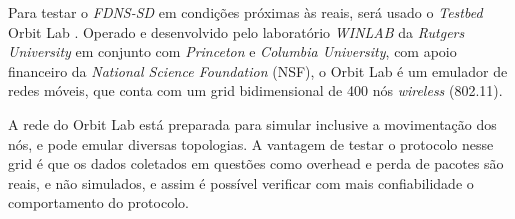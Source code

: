 
Para testar o \textit{FDNS-SD} em condições próximas às reais, será usado o
\textit{Testbed} Orbit Lab \cite{orbit}. Operado e desenvolvido pelo laboratório
\textit{WINLAB} \cite{winlab} da \textit{Rutgers University} em conjunto com
\textit{Princeton} e \textit{Columbia University}, com apoio financeiro da
\textit{National Science Foundation} (NSF), o Orbit Lab é um emulador de redes
móveis, que conta com um grid bidimensional de 400 nós \textit{wireless} (802.11).

A rede do Orbit Lab está preparada para simular inclusive a movimentação dos nós,
e pode emular diversas topologias. A vantagem de testar o protocolo nesse grid é
que os dados coletados em questões como overhead e perda de pacotes são reais, e
não simulados, e assim é possível verificar com mais confiabilidade o comportamento
do protocolo.